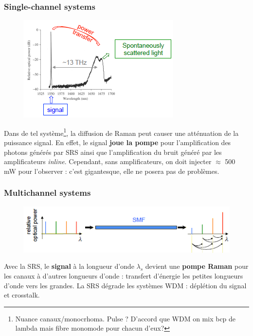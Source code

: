 \subsubsection{Single-channel systems}
\begin{figure}
	\vspace{-5mm}
	\includegraphics[scale=0.55]{ch6/image29}
	\end{figure}
Dans de tel système\footnote{Nuance canaux/monocrhoma. Pulse ? D'accord que WDM on mix bcp de lambda
mais fibre monomode pour chacun d'eux?}, la diffusion de Raman peut
causer une atténuation de la puissance signal. En effet, le signal \textbf{joue la pompe} pour
l'amplification des photons générés par SRS ainsi que l'amplification du bruit généré par les
amplificateurs \textit{inline}. Cependant, sans amplificateurs, on doit injecter $\approx$ 500
mW pour l'observer : c'est gigantesque, elle ne posera pas de problèmes. 

\newpage
\subsubsection{Multichannel systems}
\begin{figure}
	\vspace{-5mm}
	\includegraphics[scale=0.55]{ch6/image30}
	\end{figure}
Avec la SRS, le \textbf{signal} à la longueur d'onde $\lambda_s$ devient une \textbf{pompe Raman} 
pour les canaux à d'autres longueurs d'onde : transfert d'énergie les petites longueurs d'onde
vers les grandes. La SRS dégrade les systèmes WDM : déplétion du signal et crosstalk.\\

